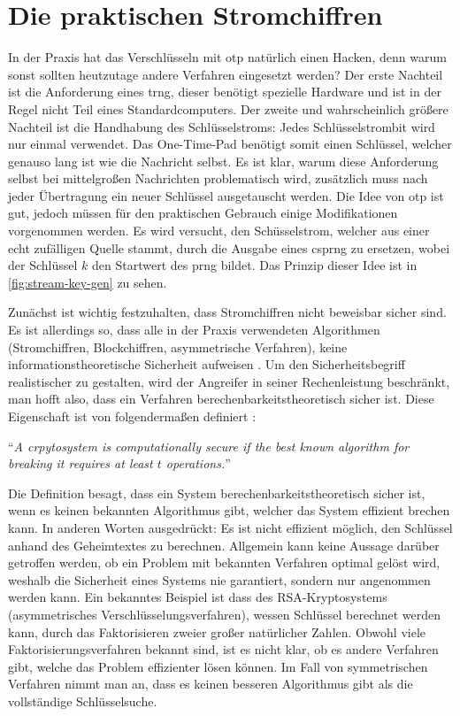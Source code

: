 \section{Die praktischen Stromchiffren}
In der Praxis hat das Verschlüsseln mit \ac{otp} natürlich einen Hacken, denn warum sonst
sollten heutzutage andere Verfahren eingesetzt werden?
Der erste Nachteil ist die Anforderung eines \ac{trng}, dieser benötigt spezielle
Hardware und ist in der Regel nicht Teil eines Standardcomputers.
Der zweite und wahrscheinlich größere Nachteil ist die Handhabung des Schlüsselstroms:
Jedes Schlüsselstrombit wird nur einmal verwendet.
Das One-Time-Pad benötigt somit einen Schlüssel, welcher genauso lang ist
wie die Nachricht selbst. Es ist klar, warum diese Anforderung
selbst bei mittelgroßen Nachrichten problematisch wird, zusätzlich muss nach jeder
Übertragung ein neuer Schlüssel ausgetauscht werden. Die Idee von \ac{otp} ist gut,
jedoch müssen für den praktischen Gebrauch einige Modifikationen vorgenommen werden.
Es wird versucht, den Schüsselstrom, welcher aus einer echt zufälligen Quelle stammt,
durch die Ausgabe eines \ac{csprng} zu ersetzen, wobei der Schlüssel $k$
den Startwert des \ac{prng} bildet. Das Prinzip dieser Idee ist in
\autoref{fig:stream-key-gen} zu sehen.



\noindent
Zunächst ist wichtig festzuhalten, dass
Stromchiffren nicht beweisbar sicher sind. Es ist allerdings so, dass alle in der
Praxis verwendeten Algorithmen (Stromchiffren, Blockchiffren, asymmetrische
Verfahren), keine informationstheoretische Sicherheit aufweisen \parencite[38]{BOOK:crypto}.
Um den Sicherheitsbegriff realistischer zu gestalten, wird der Angreifer in seiner
Rechenleistung beschränkt, man hofft also, dass ein Verfahren berechenbarkeitstheoretisch
sicher ist. Diese Eigenschaft ist von \citeauthor{BOOK:crypto}
folgendermaßen definiert \parencite*[35]{BOOK:crypto}:

\begin{definition}
  \enquote{\textit{A crpytosystem is computationally secure if the best
      known algorithm for breaking it requires at least $t$ operations.}}
\end{definition}

\noindent
Die Definition besagt, dass ein System berechenbarkeitstheoretisch sicher ist, wenn es
keinen bekannten Algorithmus gibt, welcher das System effizient brechen kann.
In anderen Worten ausgedrückt: Es ist nicht effizient möglich, den
Schlüssel anhand des Geheimtextes zu berechnen. Allgemein kann keine
Aussage darüber getroffen werden, ob ein Problem mit bekannten Verfahren
optimal gelöst wird, weshalb die Sicherheit eines Systems nie garantiert,
sondern nur angenommen werden kann. Ein bekanntes Beispiel ist dass des RSA-Kryptosystems
(asymmetrisches Verschlüsselungsverfahren), wessen Schlüssel
berechnet werden kann, durch das Faktorisieren zweier großer
natürlicher Zahlen. Obwohl viele Faktorisierungsverfahren bekannt sind, ist es nicht klar,
ob es andere Verfahren gibt, welche das Problem effizienter lösen können.
Im Fall von symmetrischen Verfahren nimmt man an, dass es keinen besseren Algorithmus
gibt als die vollständige Schlüsselsuche.
